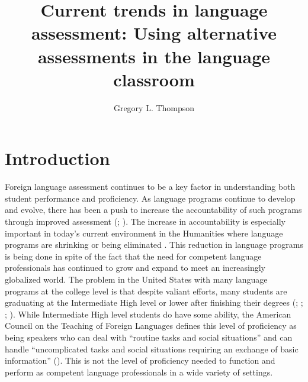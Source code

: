 \documentclass[output=paper]{langscibook}
\author{Gregory L. Thompson\affiliation{Brigham Young University}}
\title[Current trends in language assessment]
      {Current trends in language assessment: Using alternative assessments in the language classroom}
\begin{document}
\AffiliationsWithoutIndexing{}
\maketitle

\section{Introduction}
\largerpage[-1]
Foreign language assessment continues to be a key factor in understanding both student performance and proficiency. As language programs continue to develop and evolve, there has been a push to increase the accountability of such programs through improved assessment (\citealt{Bernhardt2006}; \citealt{Norris2006}). The increase in accountability is especially important in today’s current environment in the Humanities where language programs are shrinking or being eliminated \citep{Johnson2019}. This reduction in language programs is being done in spite of the fact that the need for competent language professionals has continued to grow and expand to meet an increasingly globalized world. The problem in the United States with many language programs at the college level is that despite valiant efforts, many students are graduating at the Intermediate High level or lower after finishing their degrees (\citealt{Rifkin2005}; \citealt{Magnan1986}; \citealt{Swender2003}; \citealt{Tschirner2016}). While Intermediate High level students do have some ability, the American Council on the Teaching of Foreign Languages defines this level of proficiency as being speakers who can deal with “routine tasks and social situations” and can handle “uncomplicated tasks and social situations requiring an exchange of basic information” (\citealt[7]{ACTFL2012}). This is not the level of proficiency needed to function and perform as competent language professionals in a wide variety of settings.
\end{document}
